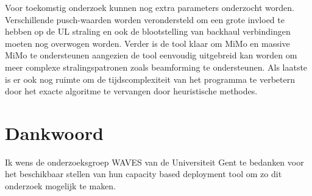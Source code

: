\documentclass[twocolumn]{phdsymp_dutch}
\begin{document}
Voor toekomstig onderzoek kunnen nog extra parameters onderzocht worden. Verschillende 
 \gls{pusch}-waarden worden verondersteld om een grote invloed te hebben op de 
 \gls{UL} straling en ook de blootstelling van  
backhaul verbindingen moeten nog overwogen worden.
Verder is de tool klaar om MiMo en massive MiMo te ondersteunen aangezien 
de tool eenvoudig uitgebreid kan worden om meer complexe stralingspatronen zoals beamforming te ondersteunen.
Als laatste is er ook nog ruimte om de tijdscomplexiteit van het programma te verbetern door het exacte algoritme 
te vervangen door heuristische methodes. 


\section*{Dankwoord}

Ik wens de onderzoeksgroep WAVES van de Universiteit Gent te bedanken voor 
het beschikbaar stellen van hun capacity based deployment tool om zo dit onderzoek mogelijk te maken.



\end{document}
